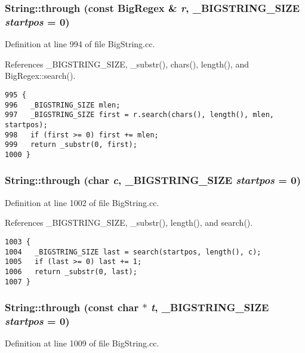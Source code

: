 \subsubsection{ String::through (const {\bf Big\-Regex} \& {\em r}, {\bf \_\-BIGSTRING\_\-SIZE} {\em startpos} = 0)}\label{classString_a69}




Definition at line 994 of file Big\-String.cc.

References \_\-BIGSTRING\_\-SIZE, \_\-substr(), chars(), length(), and Big\-Regex::search().



\footnotesize\begin{verbatim}995 {
996   _BIGSTRING_SIZE mlen;
997   _BIGSTRING_SIZE first = r.search(chars(), length(), mlen, startpos);
998   if (first >= 0) first += mlen;
999   return _substr(0, first);
1000 }
\end{verbatim}\normalsize 
{}
\subsubsection{ String::through (char {\em c}, {\bf \_\-BIGSTRING\_\-SIZE} {\em startpos} = 0)}\label{classString_a68}




Definition at line 1002 of file Big\-String.cc.

References \_\-BIGSTRING\_\-SIZE, \_\-substr(), length(), and search().



\footnotesize\begin{verbatim}1003 {
1004   _BIGSTRING_SIZE last = search(startpos, length(), c);
1005   if (last >= 0) last += 1;
1006   return _substr(0, last);
1007 }
\end{verbatim}\normalsize 
{}
\subsubsection{ String::through (const char $\ast$ {\em t}, {\bf \_\-BIGSTRING\_\-SIZE} {\em startpos} = 0)}\label{classString_a67}




Definition at line 1009 of file Big\-String.cc.

